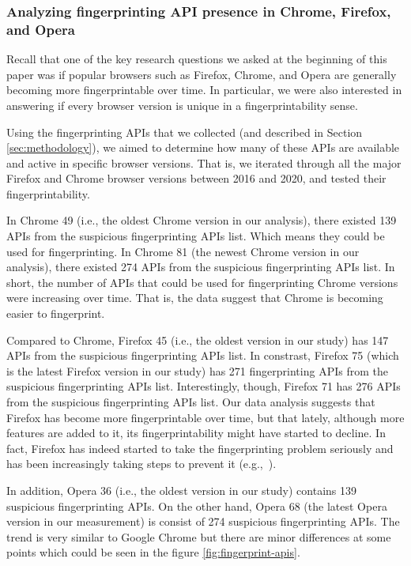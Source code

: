 \subsubsection{Analyzing fingerprinting API presence in Chrome, Firefox, and Opera}

Recall that one of the key research questions we asked at the beginning of
this paper was if popular browsers such as Firefox, Chrome, and Opera are
generally becoming more fingerprintable over time. In particular, we
were also interested in answering if every browser version is unique
in a fingerprintability sense.

Using the fingerprinting APIs that we collected (and described in
Section \ref{sec:methodology}), we aimed to determine how many of
these APIs are available and active in specific browser versions. That
is, we iterated through all the major Firefox and Chrome browser
versions between 2016 and 2020, and tested their fingerprintability.

In Chrome 49 (i.e., the oldest Chrome version in our analysis),
there existed 139 APIs from the suspicious fingerprinting APIs list. Which
means they could be used for fingerprinting. In Chrome
81 (the newest Chrome version in our analysis), there
existed 274 APIs from the suspicious fingerprinting APIs list. In short, the
number of APIs that could be used for fingerprinting Chrome versions
were increasing over time. That is, the data suggest that Chrome is
becoming easier to fingerprint.

Compared to Chrome, Firefox 45 (i.e., the oldest version in our study)
has 147 APIs from the suspicious fingerprinting APIs list. In constrast,
Firefox 75 (which is the latest Firefox version in our study) has 271
fingerprinting APIs from the suspicious fingerprinting APIs list.
Interestingly, though, Firefox 71 has 276 APIs from the suspicious
fingerprinting APIs list. Our data analysis suggests that
Firefox has become more fingerprintable over time, but that lately,
although more features are added to it, its fingerprintability might
have started to decline. In fact, Firefox has indeed started to take
the fingerprinting problem seriously and has been increasingly taking
steps to prevent it (e.g.,~\cite{FirefoxFingerprinting}).

In addition, Opera 36 (i.e., the oldest version in our study) contains 139
suspicious fingerprinting APIs. On the other hand, Opera 68 (the latest Opera version in our measurement)
is consist of 274 suspicious fingerprinting APIs. The trend is very similar to Google Chrome but there are minor
differences at some points which could be seen in the figure \ref{fig:fingerprint-apis}.

